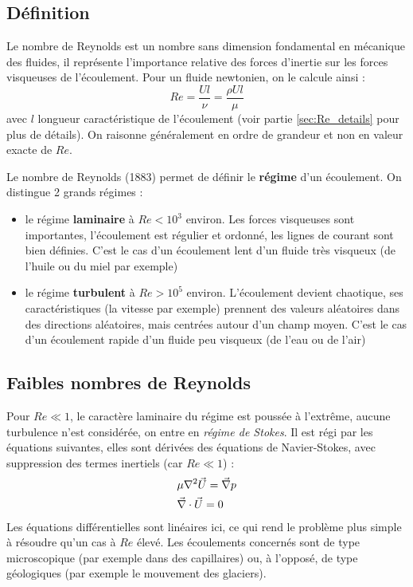 
\subsection{Définition}
Le nombre de Reynolds est un nombre sans dimension fondamental en mécanique des fluides, il représente l'importance relative des forces d'inertie sur les forces visqueuses de l'écoulement. Pour un fluide newtonien, on le calcule ainsi :
%
\begin{equation}
Re = \frac{Ul}{\nu} = \frac{\rho U l}{\mu}
\end{equation}
%
avec $l$ longueur caractéristique de l'écoulement (voir partie \ref{sec:Re_details} pour plus de détails). On raisonne généralement en ordre de grandeur et non en valeur exacte de $Re$.

Le nombre de Reynolds (1883) permet de définir le \textbf{régime} d'un écoulement. On distingue 2 grands régimes :
%
\begin{itemize}\renewcommand{\labelitemi}{$\bullet$}
\item le régime \textbf{laminaire} à $Re<10^3$ environ. Les forces visqueuses sont importantes, l'écoulement est régulier et ordonné, les lignes de courant sont bien définies. C'est le cas d'un écoulement lent d'un fluide très visqueux (de l'huile ou du miel par exemple)

\item le régime \textbf{turbulent} à $Re>10^5$ environ. L'écoulement devient chaotique, ses caractéristiques (la vitesse par exemple) prennent des valeurs aléatoires dans des directions aléatoires, mais centrées autour d'un champ moyen. C'est le cas d'un écoulement rapide d'un fluide peu visqueux (de l'eau ou de l'air)
\end{itemize}


\subsection{Faibles nombres de Reynolds}
Pour $Re \ll 1$, le caractère laminaire du régime est poussée à l'extrême, aucune turbulence n'est considérée, on entre en \textit{régime de Stokes}. Il est régi par les équations suivantes, elles sont dérivées des équations de Navier-Stokes, avec suppression des termes inertiels (car $Re \ll 1$) :
%
\begin{align}[left=\empheqlbrace]
 & \mu \nabla^2 \vec{U} = \vec{\nabla} p\\
 \notag & \vec{\nabla} \cdot \vec{U} = 0
\end{align}
%
Les équations différentielles sont linéaires ici, ce qui rend le problème plus simple à résoudre qu'un cas à $Re$ élevé. Les écoulements concernés sont de type microscopique (par exemple dans des capillaires) ou, à l'opposé, de type géologiques (par exemple le mouvement des glaciers).


